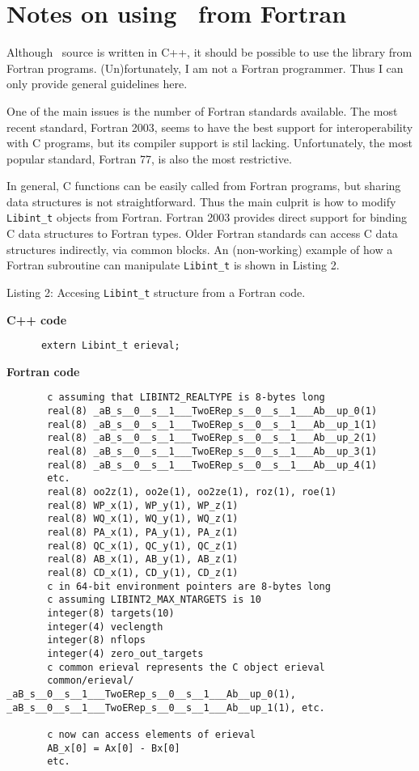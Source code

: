 \documentclass[12pt]{article}
\begin{document}
\section{\label{sec:fort} Notes on using \LIBINT\ from Fortran}

Although \LIBINT\ source is written in C++, it should be possible to use the library
from Fortran programs. (Un)fortunately, I am not a Fortran programmer. Thus I can
only provide general guidelines here.

One of the main issues is the number of Fortran standards available. The most recent standard, Fortran 2003,
seems to have the best support for interoperability with C programs, but its compiler support is stil lacking.
Unfortunately, the most popular standard, Fortran 77, is also the most restrictive.

In general, C functions can be easily called from Fortran programs, but sharing data structures
is not straightforward. Thus the main culprit is how to modify  {\tt Libint\_t} objects
from Fortran. Fortran 2003 provides direct support for binding C data structures to
Fortran types. Older Fortran standards can access C data structures indirectly, via
common blocks. An (non-working) example of how a Fortran subroutine can manipulate {\tt Libint\_t}
is shown in Listing 2.

\begin{footnotesize}
Listing 2: Accesing {\tt Libint\_t} structure from a Fortran code.

{\bf C++ code}
\begin{verbatim}
      extern Libint_t erieval;
\end{verbatim}

{\bf Fortran code}
\begin{verbatim}
       c assuming that LIBINT2_REALTYPE is 8-bytes long
       real(8) _aB_s__0__s__1___TwoERep_s__0__s__1___Ab__up_0(1)
       real(8) _aB_s__0__s__1___TwoERep_s__0__s__1___Ab__up_1(1)
       real(8) _aB_s__0__s__1___TwoERep_s__0__s__1___Ab__up_2(1)
       real(8) _aB_s__0__s__1___TwoERep_s__0__s__1___Ab__up_3(1)
       real(8) _aB_s__0__s__1___TwoERep_s__0__s__1___Ab__up_4(1)
       etc.
       real(8) oo2z(1), oo2e(1), oo2ze(1), roz(1), roe(1)
       real(8) WP_x(1), WP_y(1), WP_z(1)
       real(8) WQ_x(1), WQ_y(1), WQ_z(1)
       real(8) PA_x(1), PA_y(1), PA_z(1)
       real(8) QC_x(1), QC_y(1), QC_z(1)
       real(8) AB_x(1), AB_y(1), AB_z(1)
       real(8) CD_x(1), CD_y(1), CD_z(1)
       c in 64-bit environment pointers are 8-bytes long
       c assuming LIBINT2_MAX_NTARGETS is 10
       integer(8) targets(10)
       integer(4) veclength
       integer(8) nflops
       integer(4) zero_out_targets
       c common erieval represents the C object erieval
       common/erieval/ _aB_s__0__s__1___TwoERep_s__0__s__1___Ab__up_0(1), _aB_s__0__s__1___TwoERep_s__0__s__1___Ab__up_1(1), etc.

       c now can access elements of erieval
       AB_x[0] = Ax[0] - Bx[0]
       etc.
\end{verbatim}
\end{footnotesize}
\end{document}
